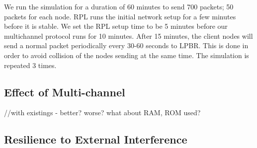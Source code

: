We run the simulation for a duration of 60 minutes to send 700 packets; 50 packets for each node. RPL runs the initial network setup for a few minutes before it is stable. We set the RPL setup time to be 5 minutes before our multichannel protocol runs for 10 minutes. After 15 minutes, the client nodes will send a normal packet periodically every 30-60 seconds to LPBR. This is done in order to avoid collision of the nodes sending at the same time. The simulation is repeated 3 times.




\subsection{Effect of Multi-channel}
//with existings - better? worse? what about RAM, ROM used?

\subsection{Resilience to External Interference}